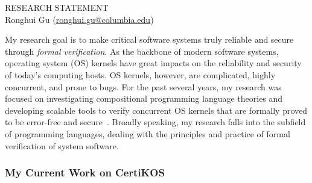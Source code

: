 \documentclass[a4paper, 10pt]{article}
\newcommand*{\email}[1]{\normalsize\href{mailto:#1}{#1}}
\begin{document}
\begin{small}

\begin{center}
{RESEARCH STATEMENT}\\
\vspace*{0.2cm}
{\normalsize Ronghui Gu (\email{ronghui.gu@columbia.edu})}
\end{center}



My research goal is to make critical software systems truly reliable and secure through \emph{formal verification}.
As the backbone of 
modern software systems,
operating system (OS) kernels
  have great impacts on the reliability and security of today's computing hosts. OS kernels, however, are complicated, highly concurrent, and prone to bugs.  For the past several years,  my research was focused on investigating compositional programming language theories and developing scalable tools to verify concurrent OS kernels that are formally proved to be error-free and secure~\cite{sosp19-nelson, sosp19-zou,popl15-gu, osdi16-gu, pldi16-security, pldi16-device, cav17-yuan, oopsla17-zhai, aplas17-kim, jar-device, pldi18-gu, cacm-gu}.
Broadly speaking, my research
falls into 
the subfield of programming languages,
dealing with the principles and practice of  formal verification
of  system software.



\subsubsection*{\large My Current Work on CertiKOS}


\end{small}
\end{document}
